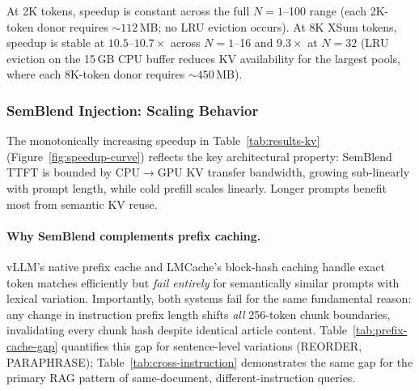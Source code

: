 \documentclass[10pt,twocolumn]{article}
\begin{document}
At 2K tokens, speedup is constant across the full $N{=}1$--100 range
(each 2K-token donor requires ${\sim}112$\,MB; no LRU eviction occurs).
At 8K XSum tokens, speedup is stable at $10.5$--$10.7\times$
across $N{=}1$--16 and $9.3\times$ at $N{=}32$ (LRU eviction on
the 15\,GB CPU buffer reduces KV availability for the largest pools,
where each 8K-token donor requires ${\sim}450$\,MB).

\subsubsection{SemBlend Injection: Scaling Behavior}
\label{sec:semblend-injection-results}

The monotonically increasing speedup in Table~\ref{tab:results-kv}
(Figure~\ref{fig:speedup-curve}) reflects the key architectural property:
SemBlend TTFT is bounded by CPU$\to$GPU KV transfer bandwidth, growing
sub-linearly with prompt length, while cold prefill scales linearly.
Longer prompts benefit most from semantic KV reuse.

\paragraph{Why SemBlend complements prefix caching.}
vLLM's native prefix cache and LMCache's block-hash caching handle
exact token matches efficiently but \emph{fail entirely} for semantically
similar prompts with lexical variation. Importantly, both systems fail
for the same fundamental reason: any change in instruction prefix
length shifts \emph{all} 256-token chunk boundaries, invalidating every
chunk hash despite identical article content.
Table~\ref{tab:prefix-cache-gap} quantifies this gap for sentence-level
variations (REORDER, PARAPHRASE); Table~\ref{tab:cross-instruction} demonstrates
the same gap for the primary RAG pattern of same-document,
different-instruction queries.
\end{document}
